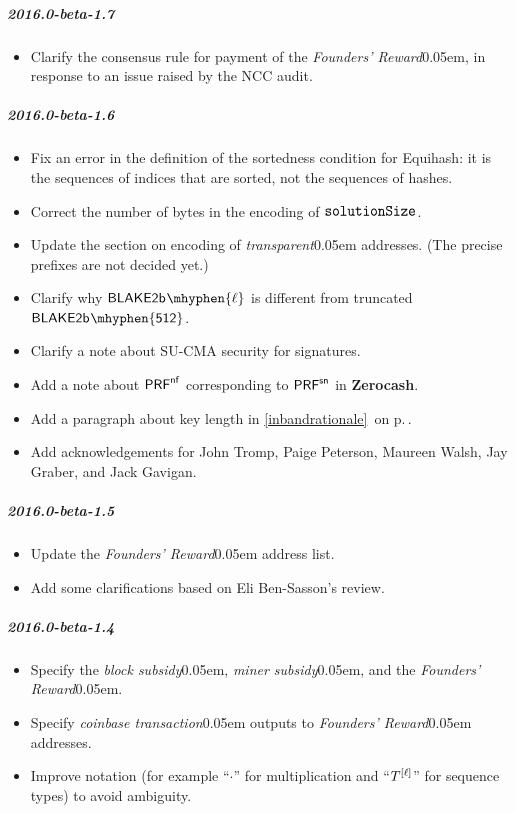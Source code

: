 \documentclass{article}
\renewcommand{\emph}[1]{\hspace{0.15em}{\fontfamily{pnc}\selectfont\scalebox{1.02}[0.999]{\textit{#1}}}\hspace{0.02em}}
\let\oldmathtt\mathtt
\renewcommand{\mathtt}[1]{\scalebox{1.02}[1.07]{$\oldmathtt{#1}$}}
\newcommand{\crossref}[1]{\autoref{#1}\, \emph{`\nameref*{#1}\kern -0.05em'} on p.\,\pageref*{#1}}
\newcommand{\introlist}{\needspace{15ex}}
\numberwithin{theorem}{subsection}
\newcommand{\term}[1]{\textsl{#1}\kern 0.05em\xspace}
\newcommand{\termbf}[1]{\textbf{#1}\xspace}
\newcommand{\Zerocash}{\termbf{Zerocash}}
\newcommand{\coinbaseTransaction}{\term{coinbase transaction}}
\newcommand{\transparent}{\term{transparent}}
\newcommand{\typeexp}[2]{{#1}\vphantom{)}^{[{#2}]}}
\newcommand{\BlakeTwob}[1]{\mathsf{BLAKE2b\kern 0.05em\mhyphen{#1}}}
\newcommand{\mult}{\cdot}
\newcommand{\PRF}[2]{\mathsf{{PRF}^{#2}_\mathnormal{#1}}}
\newcommand{\PRFnf}[1]{\PRF{#1}{\nf}}
\newcommand{\PRFsn}[1]{\PRF{#1}{sn}}
\newcommand{\nf}{\mathsf{nf}}
\newcommand{\blockSubsidy}{\term{block subsidy}}
\newcommand{\minerSubsidy}{\term{miner subsidy}}
\newcommand{\foundersReward}{\term{Founders' Reward}}
\newcommand{\solutionSize}{\mathtt{solutionSize}}
\begin{document}
\introlist
\subparagraph{2016.0-beta-1.7}

\begin{itemize}
    \item Clarify the consensus rule for payment of the \foundersReward, in
          response to an issue raised by the NCC audit.
\end{itemize}

\introlist
\subparagraph{2016.0-beta-1.6}

\begin{itemize}
    \item Fix an error in the definition of the sortedness condition for Equihash:
          it is the sequences of indices that are sorted, not the sequences of
          hashes.
    \item Correct the number of bytes in the encoding of $\solutionSize$.
    \item Update the section on encoding of \transparent addresses.
          (The precise prefixes are not decided yet.)
    \item Clarify why $\BlakeTwob{\ell}$ is different from truncated $\BlakeTwob{512}$.
    \item Clarify a note about SU-CMA security for signatures.
    \item Add a note about $\PRFnf{}$ corresponding to $\PRFsn{}$ in \Zerocash.
    \item Add a paragraph about key length in \crossref{inbandrationale}.
    \item Add acknowledgements for John Tromp, Paige Peterson, Maureen Walsh,
          Jay Graber, and Jack Gavigan.
\end{itemize}

\introlist
\subparagraph{2016.0-beta-1.5}

\begin{itemize}
    \item Update the \foundersReward address list.
    \item Add some clarifications based on Eli Ben-Sasson's review.
\end{itemize}

\introlist
\subparagraph{2016.0-beta-1.4}

\begin{itemize}
    \item Specify the \blockSubsidy, \minerSubsidy, and the \foundersReward.
    \item Specify \coinbaseTransaction outputs to \foundersReward addresses.
    \item Improve notation (for example ``$\mult$'' for multiplication and
          ``$\typeexp{T}{\ell}$'' for sequence types) to avoid ambiguity.
\end{itemize}
\end{document}
